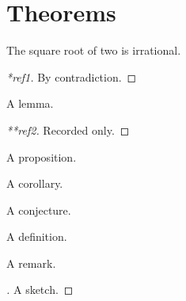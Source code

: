 \flmHeading[toc=true]
\section{Theorems}{\flmLabels{}}

\begin{theorem}[My Theorem]\flmLabels{\label{ref1}}
The square root of two is irrational.
\end{theorem}

\begin{proof}[*ref1]
By contradiction.
\end{proof}

\begin{lemma}\flmLabels{\label{ref2}}
A lemma.
\end{lemma}

\begin{proof}[**ref2]
Recorded only.
\end{proof}

\begin{proposition}\noproofref A proposition.
\end{proposition}

\begin{corollary}\flmLabels{\label{ref3}}\noproofref A corollary.
\end{corollary}

\begin{conjecture}
A conjecture.
\end{conjecture}

\begin{definition}\flmLabels{\label{ref4}}
A definition.
\end{definition}

\begin{remark}
A remark.
\end{remark}

\begin{proof}[{}]
A sketch.
\end{proof}

